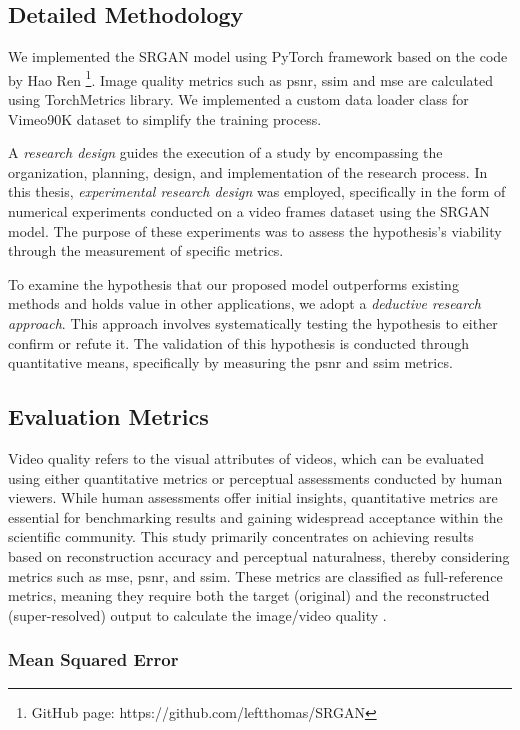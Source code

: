 \documentclass[conference]{IEEEtran}
\begin{document}
\subsection{Detailed Methodology}

We implemented the SRGAN model using PyTorch framework based on the code by Hao Ren \footnote{GitHub page: https://github.com/leftthomas/SRGAN}. Image quality metrics such as \acrshort{psnr}, \acrshort{ssim} and \acrshort{mse} are calculated using TorchMetrics library. We implemented a custom data loader class for Vimeo90K dataset to simplify the training process.

A \emph{research design} guides the execution of a study by encompassing the organization, planning, design, and implementation of the research process.  In this thesis, \emph{experimental research design} was employed, specifically in the form of numerical experiments conducted on a video frames dataset using the SRGAN model. The purpose of these experiments was to assess the hypothesis's viability through the measurement of specific metrics.

To examine the hypothesis that our proposed model outperforms existing methods and holds value in other applications, we adopt a \emph{deductive research approach}. This approach involves systematically testing the hypothesis to either confirm or refute it. The validation of this hypothesis is conducted through quantitative means, specifically by measuring the \acrshort{psnr} and \acrfull{ssim} metrics.

\subsection{Evaluation Metrics}
Video quality refers to the visual attributes of videos, which can be evaluated using either quantitative metrics or perceptual assessments conducted by human viewers. While human assessments offer initial insights, quantitative metrics are essential for benchmarking results and gaining widespread acceptance within the scientific community. This study primarily concentrates on achieving results based on reconstruction accuracy and perceptual naturalness, thereby considering metrics such as \acrfull{mse}, \acrfull{psnr}, and \acrfull{ssim}. These metrics are classified as full-reference metrics, meaning they require both the target (original) and the reconstructed (super-resolved) output to calculate the image/video quality \cite{deep_learning_image_sr_2020}.

\subsubsection{Mean Squared Error}
\end{document}
